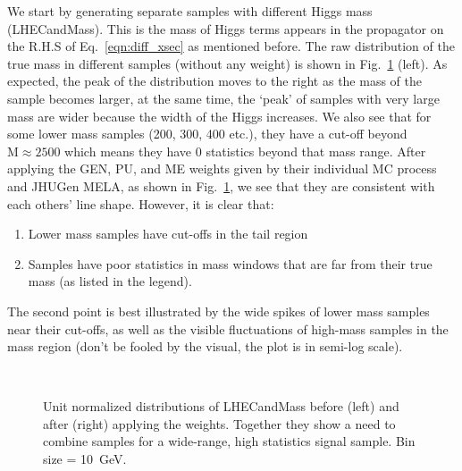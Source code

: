 We start by generating separate samples with different Higgs mass (LHECandMass).
This is the mass of Higgs terms appears in the propagator on 
the R.H.S of Eq.~\ref{eqn:diff_xsec} as mentioned before. The raw distribution of the true mass
in different samples (without any weight) is shown in Fig.~\ref{fig:LHE_raw} (left). As expected, 
the peak of the distribution moves to the right as the mass of the sample becomes larger, at the
same time, the `peak' of samples with very large mass are wider because the width of the Higgs increases.
We also see that for some lower mass
samples (200, 300, 400 etc.), they have a cut-off beyond $\mathrm{M}\approx2500$ which means they have 0
statistics beyond that mass range. After applying the GEN, PU, and ME weights given by their
individual MC process and JHUGen MELA, as shown in Fig.~\ref{fig:LHE_raw},
we see that they are consistent with each others' line shape. However, it is clear
that:
\begin{enumerate}[label=(\roman*)]
    \item Lower mass samples have cut-offs in the tail region
    \item Samples have poor statistics in mass windows that are 
        far from their true mass (as listed in the legend).
\end{enumerate}
The second point is best illustrated by the wide spikes of lower mass samples near their cut-offs,
as well as the visible fluctuations of high-mass samples in the mass region (don't be fooled by the 
visual, the plot is in semi-log scale).
\begin{figure}[htb]
    \begin{center}
        \\
    \end{center}
    \caption{Unit normalized distributions of LHECandMass before (left) and after (right) applying
        the weights. Together they show a need to combine samples for a wide-range, high
    statistics signal sample. Bin size = \SI{10}{\giga\electronvolt}.}
    \label{fig:LHE_raw}
\end{figure}

